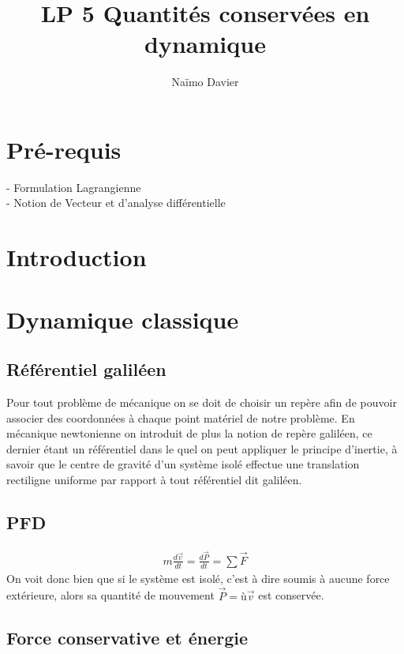 \documentclass[12pt,prb,aps,epsf]{report}
\begin{document}
	
	\title{LP 5 Quantités conservées en dynamique}
	\author{Naïmo Davier}
	
	\maketitle
	
	\tableofcontents
	
	\pagebreak

\section{Pré-requis}
	- Formulation Lagrangienne\\
	- Notion de Vecteur et d'analyse différentielle\\
	
\section{Introduction}
\section{Dynamique classique}
\subsection{Référentiel galiléen}
Pour tout problème de mécanique on se doit de choisir un repère afin de pouvoir associer des coordonnées à chaque point matériel de notre problème. En mécanique newtonienne on introduit de plus la notion de repère galiléen, ce dernier étant un référentiel dans le quel on peut appliquer le principe d'inertie, à savoir que le centre de gravité d'un système isolé effectue une translation rectiligne uniforme par rapport à tout référentiel dit galiléen.
\subsection{PFD}
\begin{eqnarray}
m\frac{d\vec{v}}{dt} = \frac{d\vec{P}}{dt} = \sum\vec{F}
\end{eqnarray}
On voit donc bien que si le système est isolé, c'est à dire soumis à aucune force extérieure, alors sa quantité de mouvement $\vec{P}=ù\vec{v}$ est conservée.
\subsection{Force conservative et énergie}
\end{document}

